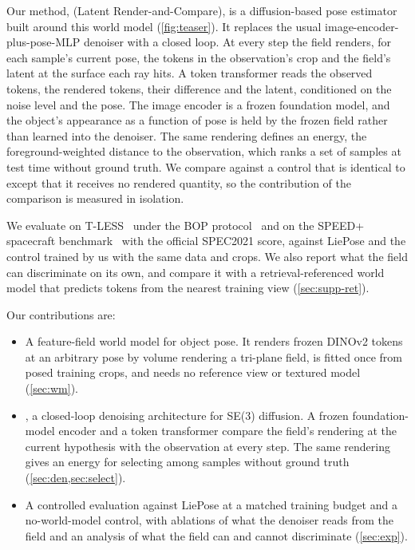 Our method, \method (Latent Render-and-Compare), is a diffusion-based pose estimator built around this world model
(\cref{fig:teaser}). It replaces the usual image-encoder-plus-pose-MLP denoiser with a closed loop. At every step the field renders,
for each sample's current pose, the tokens in the observation's crop and the field's latent at the surface each ray hits. A token
transformer reads the observed tokens, the rendered tokens, their difference and the latent, conditioned on the noise level and the
pose. The image encoder is a frozen foundation model, and the object's appearance as a function of pose is held by the frozen field
rather than learned into the denoiser. The same rendering defines an energy, the foreground-weighted distance to the observation, which
ranks a set of samples at test time without ground truth. We compare against a control that is identical to \method except that it
receives no rendered quantity, so the contribution of the comparison is measured in isolation.

We evaluate on T-LESS~\cite{hodan2017tless} under the BOP protocol~\cite{hodan2018bop} and on the SPEED+ spacecraft
benchmark~\cite{park2022speedplus} with the official SPEC2021 score, against LiePose and the control trained by us with the same data
and crops. We also report what the field can discriminate on its own, and compare it with a retrieval-referenced world model that
predicts tokens from the nearest training view (\cref{sec:supp-ret}). 

\noindent Our contributions are:
\begin{itemize}
\item A feature-field world model for object pose. It renders frozen DINOv2 tokens at an arbitrary pose by volume rendering a
tri-plane field, is fitted once from posed training crops, and needs no reference view or textured model (\cref{sec:wm}).
\item \method, a closed-loop denoising architecture for SE(3) diffusion. A frozen foundation-model encoder and a token transformer
compare the field's rendering at the current hypothesis with the observation at every step. The same rendering gives an energy for
selecting among samples without ground truth (\cref{sec:den,sec:select}).
\item A controlled evaluation against LiePose at a matched training budget and a no-world-model control, with ablations of what the
denoiser reads from the field and an analysis of what the field can and cannot discriminate (\cref{sec:exp}).
\end{itemize}
